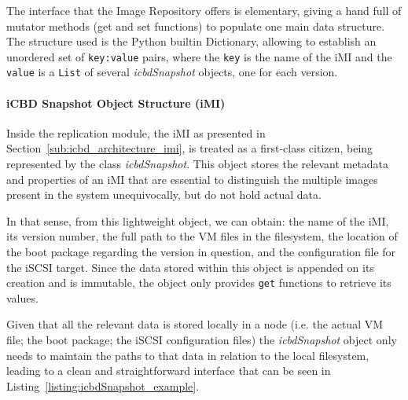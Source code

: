 The interface that the Image Repository offers is elementary, giving a hand full of mutator methods (get and set functions) to populate one main data structure. The structure used is the Python builtin Dictionary, allowing to establish an unordered set of \texttt{key:value} pairs, where the \texttt{key} is the name of the iMI and the \texttt{value} is a \texttt{List} of several \textit{icbdSnapshot} objects, one for each version.

\paragraph{iCBD Snapshot Object Structure (iMI)}
\label{par:icbd_snapshot}

Inside the replication module, the iMI as presented in Section~\ref{sub:icbd_architecture_imi},  is treated as a first-class citizen, being represented by the class \textit{icbdSnapshot}. This object stores the relevant metadata and properties of an iMI that are essential to distinguish the multiple images present in the system unequivocally, but do not hold actual data.

In that sense, from this lightweight object, we can obtain: the name of the iMI, its version number, the full path to the VM files in the filesystem, the location of the boot package regarding the version in question, and the configuration file for the iSCSI target. Since the data stored within this object is appended on its creation and is immutable, the object only provides \texttt{get} functions to retrieve its values.

Given that all the relevant data is stored locally in a node (i.e. the actual VM file; the boot package; the iSCSI configuration files) the \textit{icbdSnapshot} object only needs to maintain the paths to that data in relation to the local filesystem, leading to a clean and straightforward interface that can be seen in Listing~\ref{listing:icbdSnapshot_example}.

